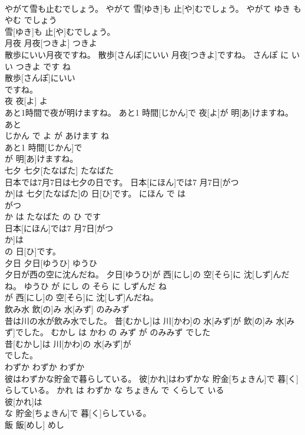 \documentclass[8pt]{extreport}
\begin{document}
\begin{CJK}{UTF8}{min}
\\	やがて雪も止むでしょう。	やがて 雪[ゆき]も 止[や]むでしょう。	やがて ゆき も やむ でしょう	
\\	雪[ゆき]も 止[や]むでしょう。			
\\	月夜	月夜[つきよ]	つきよ	
\\	散歩にいい月夜ですね。	散歩[さんぽ]にいい 月夜[つきよ]ですね。	さんぽ に いい つきよ です ね	
\\	散歩[さんぽ]にいい
\\	ですね。			
\\	夜	夜[よ]	よ	
\\	あと1時間で夜が明けますね。	あと1 時間[じかん]で 夜[よ]が 明[あ]けますね。	あと 
\\	じかん で よ が あけます ね	
\\	あと1 時間[じかん]で
\\	が 明[あ]けますね。			
\\	七夕	七夕[たなばた]	たなばた	
\\	日本では7月7日は七夕の日です。	日本[にほん]では7 月7日[がつ 
\\	か]は 七夕[たなばた]の 日[ひ]です。	にほん で は 
\\	がつ 
\\	か は たなばた の ひ です	
\\	日本[にほん]では7 月7日[がつ 
\\	か]は
\\	の 日[ひ]です。			
\\	夕日	夕日[ゆうひ]	ゆうひ	
\\	夕日が西の空に沈んだね。	夕日[ゆうひ]が 西[にし]の 空[そら]に 沈[しず]んだね。	ゆうひ が にし の そら に しずんだ ね	
\\	が 西[にし]の 空[そら]に 沈[しず]んだね。			
\\	飲み水	飲[の]み 水[みず]	のみみず	
\\	昔は川の水が飲み水でした。	昔[むかし]は 川[かわ]の 水[みず]が 飲[の]み 水[みず]でした。	むかし は かわ の みず が のみみず でした	
\\	昔[むかし]は 川[かわ]の 水[みず]が
\\	でした。			
\\	わずか	わずか	わずか	
\\	彼はわずかな貯金で暮らしている。	彼[かれ]はわずかな 貯金[ちょきん]で 暮[く]らしている。	かれ は わずか な ちょきん で くらして いる	
\\	彼[かれ]は
\\	な 貯金[ちょきん]で 暮[く]らしている。			
\\	飯	飯[めし]	めし	

\end{CJK}
\end{document}
